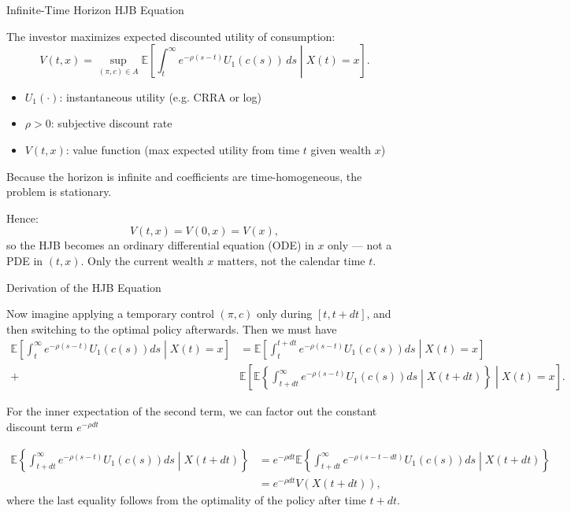 \documentclass{beamer}
\begin{document}
\begin{frame}{Infinite-Time Horizon HJB Equation}


    {\footnotesize \footnotesize
    The investor maximizes expected discounted utility of consumption:
    \[
    V(t, x) = \sup_{(\pi, c) \in A} \mathbb{E} \left[ \int_{t}^{\infty} e^{-\rho(s-t)} U_1(c(s)) \, ds \middle| X(t) = x \right].
    \]

    \begin{itemize}
        \item \( U_1(\cdot) \): instantaneous utility (e.g. CRRA or log)  
        \item \(\rho > 0\): subjective discount rate  
        \item \( V(t, x) \): value function (max expected utility from time \( t \) given wealth \( x \))
    \end{itemize}
    \par  \pause Because the horizon is infinite and coefficients are time-homogeneous, the problem is stationary.

    Hence:
    \[
    V(t, x) = V(0, x) = V(x),
    \]
    so the HJB becomes an ordinary differential equation (ODE) in \( x \) only — not a PDE in \((t, x)\).
    Only the current wealth \( x \) matters, not the calendar time \( t \).
    }
    
\end{frame}

\begin{frame}{Derivation of the HJB Equation}


    {\footnotesize \footnotesize
     \par  Now imagine applying a temporary control \((\pi, c)\) 
     only during \([t, t + dt]\), and then switching to the optimal policy afterwards. Then we must have 
         {\footnotesize \tiny
         \begin{align*}
             \mathbb{E} \left[ \int_{t}^{\infty} e^{-\rho(s-t)} U_1(c(s)) ds \middle| X(t) = x \right]
                &= \mathbb{E} \left[ \int_{t}^{t+dt} e^{-\rho(s-t)} U_1(c(s)) ds \middle| X(t) = x \right]\\
                +& \mathbb{E} \left[ \mathbb{E} \left\{ \int_{t+dt}^{\infty} 
                e^{-\rho(s-t)} U_1(c(s)) ds \middle| X(t + dt) \right\} \middle| X(t) = x \right].
         \end{align*}
    }
    \par \pause For the inner expectation of the second term, we can factor out the constant discount term $e^{-\rho dt}$ 
    
    {\footnotesize \tiny
    \begin{align*}
        \mathbb{E} \left\{ \int_{t+dt}^{\infty} e^{-\rho(s-t)} U_1(c(s)) ds \middle| X(t + dt) \right\}
        &= e^{-\rho dt} \mathbb{E} \left\{ \int_{t+dt}^{\infty} e^{-\rho(s-t-dt)} U_1(c(s)) ds \middle| X(t + dt) \right\}\\
        &= e^{-\rho dt} V(X(t + dt)),
    \end{align*}
    }
    where the last equality follows from the optimality of the policy after time \( t + dt \).

    }
    
\end{frame}
\end{document}
